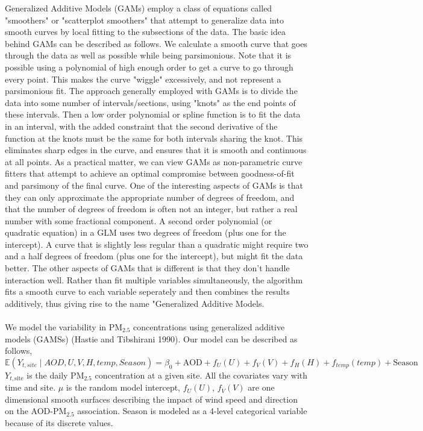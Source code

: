 \documentclass[10pt]{article}
\def\PM{{\mathrm{PM_{2.5}}}}
\begin{document}
Generalized Additive Models (GAMs) employ a class of equations called "smoothers" or "scatterplot smoothers" that attempt to generalize data into smooth curves by local fitting to the subsections of the data. The basic idea behind GAMs can be described as follows. We calculate a smooth curve that goes through the data as well as possible while being parsimonious. Note that it is possible using a polynomial of high enough order to get a curve to go through every point. This makes the curve "wiggle" excessively, and not represent a parsimonious fit. The approach generally employed with GAMs is to divide the data into some number of intervals/sections, using "knots" as the end points of these intervals. Then a low order polynomial or spline function is to fit the data in an interval, with the added constraint that the second derivative of the function at the knots must be the same for both intervals sharing the knot. This eliminates sharp edges in the curve, and ensures that it is smooth and continuous at all points. As a practical matter, we can view GAMs as non-parametric curve fitters that attempt to achieve an optimal compromise between goodness-of-fit and parsimony of the final curve. One of the interesting aspects of GAMs is that they can only approximate the appropriate number of degrees of freedom, and that the number of degrees of freedom is often not an integer, but rather a real number with some fractional component. A second order polynomial (or quadratic equation) in a GLM uses two degrees of freedom (plus one for the intercept). A curve that is slightly less regular than a quadratic might require two and a half degrees of freedom (plus one for the intercept), but might fit the data better. The other aspects of GAMs that is different is that they don't handle interaction well. Rather than fit multiple variables simultaneously, the algorithm fits a smooth curve to each variable seperately and then combines the results additively, thus giving rise to the name "Generalized Additive Models. \\ \\
We model the variability in $\PM$ concentrations using generalized additive models (GAMSs) (Hastie and Tibshirani 1990). Our model can be described as follows, 
\begin{equation} 
{\mathbb{E}}(Y_{t,site} \mid AOD, U, V, H, temp, Season) = \beta_0 + \text{AOD} + f_{U}(U) + f_{V}(V) + f_{H}(H) + f_{temp}(temp) + \text{Season}  
\end{equation} 
$Y_{t, \text{site}}$ is the daily $\PM$ concentration at a given site. All the covariates vary with time and site. $\mu$ is the random model intercept, $f_{U}(U)$, $f_{V}(V)$ are one dimensional smooth surfaces describing the impact of wind speed and direction on the AOD-$\PM$ association. Season is modeled as a 4-level categorical variable because of its discrete values. \\ \\
\end{document}
